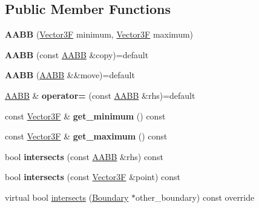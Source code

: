 \subsection*{Public Member Functions}
\begin{DoxyCompactItemize}
\item 
\mbox{\label{class_a_a_b_b_a12dd0a1fb58f12ee747de9783fcc159f}} 
{\bfseries A\+A\+BB} (\mbox{\hyperlink{class_vector3}{Vector3F}} minimum, \mbox{\hyperlink{class_vector3}{Vector3F}} maximum)
\item 
\mbox{\label{class_a_a_b_b_ab75eda9fd4f38373f45b7cf7220e2601}} 
{\bfseries A\+A\+BB} (const \mbox{\hyperlink{class_a_a_b_b}{A\+A\+BB}} \&copy)=default
\item 
\mbox{\label{class_a_a_b_b_a72cb5a605e743890dcbd31f6bf32fd1e}} 
{\bfseries A\+A\+BB} (\mbox{\hyperlink{class_a_a_b_b}{A\+A\+BB}} \&\&move)=default
\item 
\mbox{\label{class_a_a_b_b_a5dbdefebe25321ec24ac97d163898596}} 
\mbox{\hyperlink{class_a_a_b_b}{A\+A\+BB}} \& {\bfseries operator=} (const \mbox{\hyperlink{class_a_a_b_b}{A\+A\+BB}} \&rhs)=default
\item 
\mbox{\label{class_a_a_b_b_a4d2bc2fc98412ad6160c4104f0aeb983}} 
const \mbox{\hyperlink{class_vector3}{Vector3F}} \& {\bfseries get\+\_\+minimum} () const
\item 
\mbox{\label{class_a_a_b_b_a79e383c8e3010cdd1134aca704de030b}} 
const \mbox{\hyperlink{class_vector3}{Vector3F}} \& {\bfseries get\+\_\+maximum} () const
\item 
\mbox{\label{class_a_a_b_b_a9c1cca9c55355340fffd6b4f707dd70d}} 
bool {\bfseries intersects} (const \mbox{\hyperlink{class_a_a_b_b}{A\+A\+BB}} \&rhs) const
\item 
\mbox{\label{class_a_a_b_b_ad517489d4c7a73d99ca28b126283daf0}} 
bool {\bfseries intersects} (const \mbox{\hyperlink{class_vector3}{Vector3F}} \&point) const
\item 
virtual bool \mbox{\hyperlink{class_a_a_b_b_ab427a4455732a16802103e06ed4af02a}{intersects}} (\mbox{\hyperlink{class_boundary}{Boundary}} $\ast$other\+\_\+boundary) const override
\end{DoxyCompactItemize}


